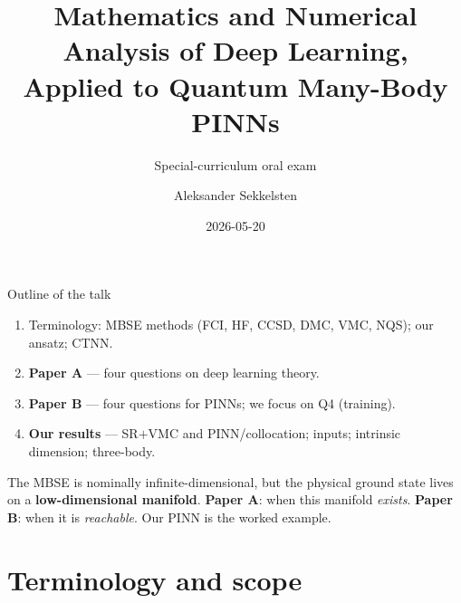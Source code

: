 \documentclass[10pt,aspectratio=169]{beamer}
\title{Mathematics and Numerical Analysis of Deep Learning,\\
Applied to Quantum Many-Body PINNs}
\subtitle{Special-curriculum oral exam}
\author{Aleksander Sekkelsten}
\institute{University of Oslo}
\date{2026-05-20}
\newcommand{\paperA}[1]{\textcolor{papA}{\textbf{#1}}}
\newcommand{\paperB}[1]{\textcolor{papB}{\textbf{#1}}}
\newcommand{\ours}[1]{\textcolor{ourwork}{\textbf{#1}}}
\begin{document}
\begin{frame}
\titlepage
\end{frame}

\begin{frame}{Outline of the talk}
\small
\begin{enumerate}\setlength\itemsep{1pt}
\item Terminology: MBSE methods (FCI, HF, CCSD, DMC, VMC, NQS); our ansatz; CTNN.
\item \paperA{Paper A} --- four questions on deep learning theory.
\item \paperB{Paper B} --- four questions for PINNs; we focus on Q4 (training).
\item \ours{Our results} --- SR$+$VMC and PINN/collocation; inputs; intrinsic dimension; three-body.
\end{enumerate}

\vfill
\begin{tcolorbox}[colback=ourwork!8,colframe=ourwork!70!black,
  title=\textbf{Running thread},fonttitle=\bfseries,boxsep=2pt]
\small The MBSE is nominally infinite-dimensional, but the physical ground state lives on a
\ours{low-dimensional manifold}. \paperA{Paper A}: when this manifold \emph{exists}.
\paperB{Paper B}: when it is \emph{reachable}. Our PINN is the worked example.
\end{tcolorbox}
\end{frame}

\section{Terminology and scope}
\end{document}
